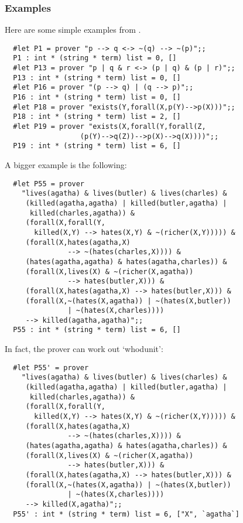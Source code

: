 \subsubsection*{Examples}

Here are some simple examples from .

\begin{boxed}\begin{verbatim}
  #let P1 = prover "p --> q <-> ~(q) --> ~(p)";;
  P1 : int * (string * term) list = 0, []
  #let P13 = prover "p | q & r <-> (p | q) & (p | r)";;
  P13 : int * (string * term) list = 0, []
  #let P16 = prover "(p --> q) | (q --> p)";;
  P16 : int * (string * term) list = 0, []
  #let P18 = prover "exists(Y,forall(X,p(Y)-->p(X)))";;
  P18 : int * (string * term) list = 2, []
  #let P19 = prover "exists(X,forall(Y,forall(Z,
                  (p(Y)-->q(Z))-->p(X)-->q(X))))";;
  P19 : int * (string * term) list = 6, []
\end{verbatim}\end{boxed}

\noindent A bigger example is the following:

\begin{boxed}\begin{verbatim}
  #let P55 = prover
    "lives(agatha) & lives(butler) & lives(charles) &
     (killed(agatha,agatha) | killed(butler,agatha) |
      killed(charles,agatha)) &
     (forall(X,forall(Y,
       killed(X,Y) --> hates(X,Y) & ~(richer(X,Y))))) &
     (forall(X,hates(agatha,X)
               --> ~(hates(charles,X)))) &
     (hates(agatha,agatha) & hates(agatha,charles)) &
     (forall(X,lives(X) & ~(richer(X,agatha))
               --> hates(butler,X))) &
     (forall(X,hates(agatha,X) --> hates(butler,X))) &
     (forall(X,~(hates(X,agatha)) | ~(hates(X,butler))
               | ~(hates(X,charles))))
     --> killed(agatha,agatha)";;
  P55 : int * (string * term) list = 6, []
\end{verbatim}\end{boxed}

\noindent In fact, the prover can work out `whodunit':

\begin{boxed}\begin{verbatim}
  #let P55' = prover
    "lives(agatha) & lives(butler) & lives(charles) &
     (killed(agatha,agatha) | killed(butler,agatha) |
      killed(charles,agatha)) &
     (forall(X,forall(Y,
       killed(X,Y) --> hates(X,Y) & ~(richer(X,Y))))) &
     (forall(X,hates(agatha,X)
               --> ~(hates(charles,X)))) &
     (hates(agatha,agatha) & hates(agatha,charles)) &
     (forall(X,lives(X) & ~(richer(X,agatha))
               --> hates(butler,X))) &
     (forall(X,hates(agatha,X) --> hates(butler,X))) &
     (forall(X,~(hates(X,agatha)) | ~(hates(X,butler))
               | ~(hates(X,charles))))
     --> killed(X,agatha)";;
  P55' : int * (string * term) list = 6, ["X", `agatha`]
\end{verbatim}\end{boxed}

